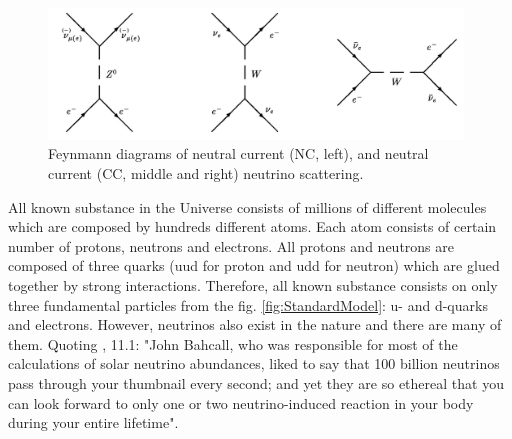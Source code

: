 \begin{figure}
\caption{Feynmann diagrams of neutral current (NC, left), and neutral current (CC, middle and right) neutrino scattering.}
\label{fig:NuScattering}
\centering
\includegraphics[width=0.98\textwidth, keepaspectratio=true]{figs/neutrinoScattering.png}
\end{figure}


All known substance in the Universe consists of millions of different molecules which are composed by hundreds different atoms. Each atom consists of certain number of protons, neutrons and electrons. All protons and neutrons are composed of three quarks (uud for proton and udd for neutron) which are glued together by strong interactions. Therefore, all known substance consists on only three fundamental particles from the fig. \ref{fig:StandardModel}: u- and d-quarks and electrons. However, neutrinos also exist in the nature and there are many of them. Quoting \cite{ref_Griffiths}, 11.1: "John Bahcall, who was responsible for most of the calculations of solar neutrino abundances, liked to say that 100 billion neutrinos pass through your thumbnail every second; and yet they are so ethereal that you can look forward to only one or two neutrino-induced reaction in your body during your entire lifetime".\\
